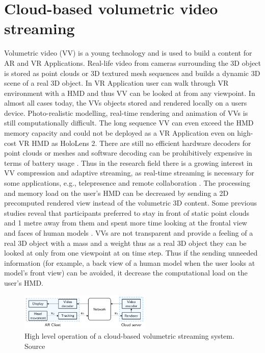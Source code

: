 \section{Cloud-based volumetric video streaming}
\label{sec:theorie:cloud}
Volumetric video (VV) is a young technology and is used to build a content for AR and VR Applications. Real-life video from cameras surrounding the 3D object is stored as point clouds or 3D textured mesh sequences and builds a dynamic 3D scene of a real 3D object. In VR Application user can walk through VR environment with a HMD and thus VV can be looked at from any viewpoint. In almost all cases today, the VVs objects stored and rendered locally on a users device. Photo-realistic modelling, real-time rendering and animation of VVs is still computationally difficult. The long sequence VV can even exceed the HMD memory capacity and could not be deployed as a VR Application even on high-cost VR HMD as HoloLens 2. There are still no efficient hardware decoders for point clouds or meshes and software decoding can be prohibitively expensive in terms of battery usage \cite{serhan_kalman}. Thus in the research field there is a growing interest in VV compression and adaptive streaming, as real-time streaming is necessary for some applications, e.g., telepresence and remote collaboration \cite{user_behav_volumetric}. The processing and memory load on the user's HMD can be decreased by sending a 2D precomputed rendered view instead of the volumetric 3D content. Some previous studies reveal that participants preferred to stay in front of static point clouds and 1 metre away from them and spent more time looking at the frontal view and faces of human models \cite{user_behav_volumetric}. VVs are not transparent and provide a feeling of a real 3D object with a mass and a weight thus as a real 3D object they can be looked at only from one viewpoint at on time step. Thus if the sending unneeded information (for example, a back view of a human model when the user looks at model's front view) can be avoided, it decrease the computational load on the user's HMD.
\begin{figure}
	\centering
	\includegraphics[width=0.56\textwidth]{gfx/cloud.png}
	\caption{\label{fig:cloud}High level operation of a cloud-based volumetric streaming system. Source \cite{serhan_kalman}}
\end{figure}

